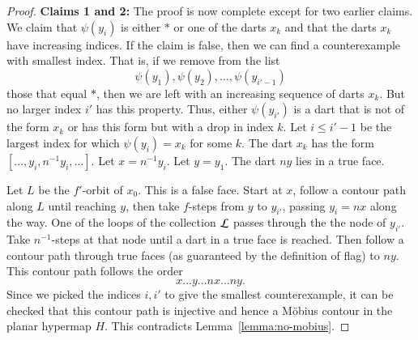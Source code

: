 \begin{proof}

{\bf Claims 1 and 2:}
The proof is now complete except for two earlier claims.  We claim
that $\psi(y_i)$ is either $*$ or one of the darts $x_k$ and that the darts
$x_k$ have increasing indices.  If the claim is false, then
we can find a counterexample with smallest index.  That is, if we remove
from the list
   $$
   \psi(y_1),\psi(y_2),\ldots,\psi(y_{i'-1})
   $$
those that equal $*$, then we are left with an increasing sequence of 
darts $x_k$.  But no larger index $i'$ has this property.  Thus, either
$\psi(y_{i'})$ is a dart that is not of the form $x_k$ or has this form
but with a drop in index $k$.  Let $i\le i'-1$
be the largest index for which $\psi(y_i)=x_k$ for some $k$.
The dart $x_k$ has the form $[\ldots,y_i,n^{-1}y_i,\ldots]$.  Let $x=n^{-1}y_i$.
Let $y=y_1$.  The dart $n y$ lies in a true face.

Let $L$ be the $f'$-orbit of $x_0$.  This is a false face.
Start at $x$, follow a contour path along $L$ until reaching $y$, then
take $f$-steps from $y$ to $y_{i'}$, passing $y_i = n x$ along the way.
One of the loops of the collection ${\cal L}$ passes through the the node of $y_{i'}$.
Take $n^{-1}$-steps at that node until a dart in a true face is reached.  Then
follow a contour path through true faces (as guaranteed by the definition
of flag) to $n y$.  
This contour path follows the order
  $$
  x\ldots y \ldots n x\ldots n y.
  $$
Since we picked the indices $i,i'$ to give the smallest counterexample, it can be checked
that this contour path is injective and hence a M\"obius contour in 
the planar hypermap $H$.  
This contradicts Lemma~\ref{lemma:no-mobius}.
\end{proof}



